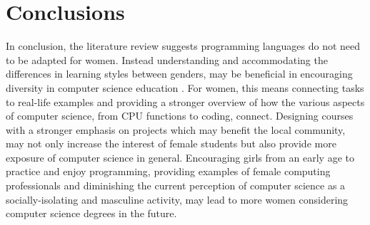 \documentclass{scrartcl}
\begin{document}
\section{Conclusions}

In conclusion, the literature review suggests programming languages do not need to be adapted for women. Instead understanding and accommodating the differences in learning styles between genders, may be beneficial in encouraging diversity in computer science education \cite{10}. For women, this means connecting tasks to real-life examples and providing a stronger overview of how the various aspects of computer science, from CPU functions to coding, connect. Designing courses with a stronger emphasis on projects which may benefit the local community, may not only increase the interest of female students but also provide more exposure of computer science in general. Encouraging girls from an early age to practice and enjoy programming, providing examples of female computing professionals and diminishing the current perception of computer science as a socially-isolating and masculine activity, may lead to more women considering computer science degrees in the future.





\end{document}

